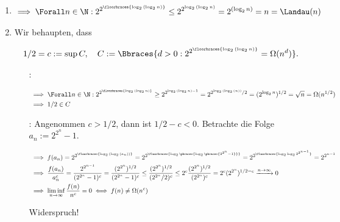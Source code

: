 \begin{solution}

\phantom{}

\begin{enumerate}

  \item

  \begin{align*}
    \implies
    \Forall n \in \N:
    2^{2^{\floorbraces{\log_2{(\log_2{n})}}}}
    \leq
    2^{2^{\log_2{(\log_2{n})}}}
    =
    2^{(\log_2{n})}
    =
    n
    =
    \Landau(n)
  \end{align*}

  \item Wir behaupten, dass
  
  \begin{align*}
    1/2 = c := \sup{C},
    \quad
    C := \Bbraces{d > 0: 2^{2^{\floorbraces{\log_2{(\log_2{n})}}}} = \Omega(n^d)}.
  \end{align*}

  \begin{itemize}

    \item
    [\Quote{$\leq$}:]

    \begin{align*}
      & \implies
      \Forall n \in \N:
      2^{2^{\floorbraces{\log_2{(\log_2{n})}}}}
      \geq
      2^{2^{\log_2{(\log_2{n})} - 1}}
      =
      2^{2^{\log_2{(\log_2{(n)})}} / 2}
      =
      (2^{\log_2{n}})^{1/2}
      =
      \sqrt{n}
      =
      \Omega(n^{1/2}) \\
      & \implies
      1/2 \in C
    \end{align*}

    \item
    [\Quote{$\geq$}:]
    Angenommen $c > 1/2$, dann ist $1/2 - c < 0$.
    Betrachte die Folge $a_n := 2^{2^n} - 1$.

    \begin{align*}
      & \implies
      f(a_n) = 2^{2^{\floorbraces{\log_2{(\log_2{(a_n)})}}}}
      =
      2^{2^{\floorbraces{\log_2 \pbraces{\log_2 \pbraces{2^{2^n} - 1}}}}}
      =
      2^{2^{\floorbraces{\log_2{\log_2{2^{2^{n-1}}}}}}}
      =
      2^{2^{n-1}} \\
      & \implies
      \frac{f(a_n)}{a_n^c}
      =
      \frac{2^{2^{n-1}}}{(2^{2^n} - 1)^c}
      =
      \frac{(2^{2^n})^{1/2}}{(2^{2^n} - 1)^c}
      \leq
      \frac{(2^{2^n})^{1/2}}{(2^{2^n}/2)^c}
      \leq
      2^c \frac{(2^{2^n})^{1/2}}{(2^{2^n})^c}
      =
      2^c (2^{2^n})^{1/2 - c}
      \xrightarrow{n \to \infty}
      0 \\
      & \implies
      \liminf_{n \to \infty}
      \frac{f(n)}{n^c} = 0
      \iff
      f(n) \neq \Omega(n^c)
    \end{align*}

    Widerspruch!
  
  \end{itemize}

\end{enumerate}

\end{solution}

